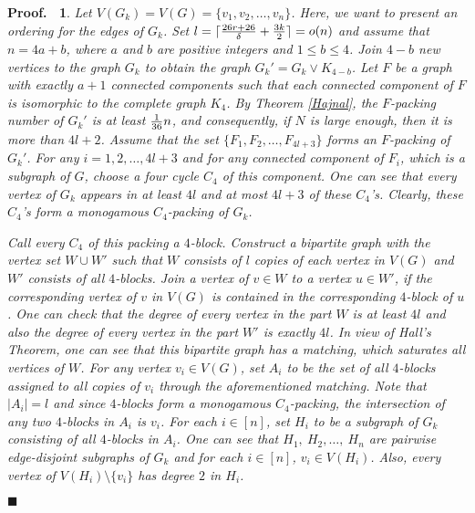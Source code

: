 \documentclass[11pt]{article}
\newtheorem{preproof}{{\bf Proof.\ }}
\newenvironment{proof}[1]{\begin{preproof}{\rm
               #1}\hfill{$\blacksquare$}}{\end{preproof}}
\begin{document}
\begin{proof}
{Let $V(G_k)=V(G)=\{v_1,v_2,\ldots,v_n\}$.  
Here, we want to present an ordering for the edges of $G_k$.
Set $l=\lceil {26r+26\over \delta}+{3k\over 2}\rceil=o(n)$ and  
assume that $n=4a+b$, where $a$ and $b$ are positive integers and $1 \leq b\leq 4$. 
Join $4-b$ new vertices to the graph $G_k$ to obtain the graph $G_k'=G_k\vee K_{4-b}$. 
Let $F$ be a graph with exactly $a+1$ connected components such that each connected component of 
$F$ is isomorphic to the complete graph $K_4$. 
By Theorem \ref{Hajnal}, the $F$-packing number of $G_k'$ is at least ${1\over 36}n$, and consequently, 
if $N$ is large enough, then it is more than 
$4l+2$. 
Assume that the set $\{F_1,F_2,\ldots,F_{4l+3}\}$ forms an $F$-packing of $G_k'$.  
For any $i=1,2,\ldots,4l+3$ 
and for any connected component of $F_i$, which is a subgraph of $G$, choose a  four cycle $C_4$  of this component. 
One can see that every vertex of $G_k$ appears in at least $4l$ and at most $4l+3$ of these $C_4$'s. 
Clearly, these $C_4$'s form a monogamous $C_4$-packing of $G_k$. 

Call every $C_4$ of this packing a {\it $4$-block}.
Construct a bipartite graph with the vertex set $W\cup W'$ such that $W$ consists of
$l$ copies of each vertex in $V(G)$
and $W'$ consists of all $4$-blocks. 
Join a vertex of $v\in W$ to a vertex $u\in W'$, if the corresponding vertex of $v$ in 
$V(G)$ is contained in the corresponding $4$-block of $u$. 
One can check that the degree of every vertex in the part $W$ is   at least $4l$ and also the degree of every vertex in the part $W'$ is exactly $4l$. 
In view of Hall's Theorem, one can see that this bipartite graph has a matching, which saturates all vertices of $W$. 
For any 
vertex $v_i\in V(G)$, set $A_i$ to be the set of all $4$-blocks assigned to all copies of $v_i$ through the aforementioned matching.
Note that $|A_i|=l$ and since $4$-blocks form a monogamous $C_4$-packing, 
the intersection of any two $4$-blocks in $A_i$ is $v_i$.  
For each $i\in[n]$, set $H_i$ to be a subgraph of $G_k$ consisting of all $4$-blocks in $A_i$.
One can see that 
$H_1,\ H_2,\ldots,\ H_n$ are pairwise edge-disjoint subgraphs of $G_k$ 
and for each $i\in [n]$, $v_i\in V(H_i)$. Also, every vertex of $V(H_i)\setminus \{v_i\}$ has degree $2$ in $H_i$. 

}
\end{proof}
\end{document}
